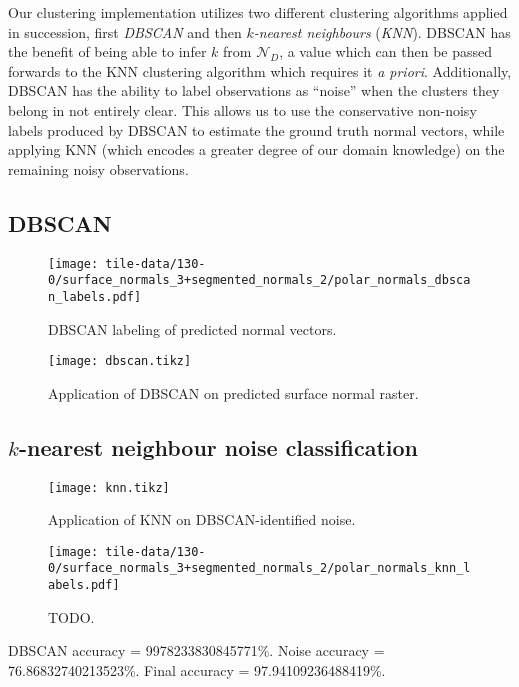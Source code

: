 Our clustering implementation utilizes two different clustering algorithms applied in succession, first \textit{DBSCAN} and then \textit{$k$-nearest neighbours} (\textit{KNN}).
DBSCAN has the benefit of being able to infer $k$ from $\mathcal{N}_D$, a value which can then be passed forwards to the KNN clustering algorithm which requires it \textit{a priori}.
Additionally, DBSCAN has the ability to label observations as \enquote{noise} when the clusters they belong in not entirely clear.
This allows us to use the conservative non-noisy labels produced by DBSCAN to estimate the ground truth normal vectors, while applying KNN (which encodes a greater degree of our domain knowledge) on the remaining noisy observations.

\subsection{DBSCAN}

\begin{wrapfigure}{r}{0.35\textwidth}
  \begin{center}
    \texttt{[image: tile-data/130-0/surface\_normals\_3+segmented\_normals\_2/polar\_normals\_dbscan\_labels.pdf]}
  \end{center}
  \caption{DBSCAN labeling of predicted normal vectors.}%
  \label{fig:polar-normal-dbscan-labels}
\end{wrapfigure}
\lipsum[1-2]

\begin{figure}[H]
  \centering
  \texttt{[image: dbscan.tikz]}
  \caption{Application of DBSCAN on predicted surface normal raster.}
\end{figure}

\subsection{\texorpdfstring{$k$}{k}-nearest neighbour noise classification}

\begin{figure}[H]
  \centering
  \texttt{[image: knn.tikz]}
  \caption{Application of KNN on DBSCAN-identified noise.}
\end{figure}

\newpage
\begin{wrapfigure}{r}{0.35\textwidth}
  \begin{center}
    \texttt{[image: tile-data/130-0/surface\_normals\_3+segmented\_normals\_2/polar\_normals\_knn\_labels.pdf]}
  \end{center}
  \caption{%
    TODO.
  }%
  \label{fig:polar-normal-knn-labels}
\end{wrapfigure}

DBSCAN accuracy = \num{9978233830845771}\%.
Noise accuracy = \num{76.86832740213523}\%.
Final accuracy = \num{97.94109236488419}\%.

\lipsum[1-2]

